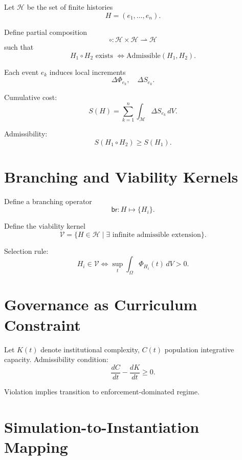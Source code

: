 \documentclass[12pt,oneside]{book}
\begin{document}
Let \(\mathcal{H}\) be the set of finite histories
\[
H = (e_1,\dots,e_n).
\]

Define partial composition
\[
\circ : \mathcal{H} \times \mathcal{H} \rightharpoonup \mathcal{H}
\]
such that
\[
H_1 \circ H_2 \text{ exists } \iff \text{Admissible}(H_1,H_2).
\]

Each event \(e_k\) induces local increments
\[
\Delta \Phi_{e_k}, \quad \Delta S_{e_k}.
\]

Cumulative cost:
\begin{equation}
S(H) = \sum_{k=1}^n \int_{\mathcal{M}} \Delta S_{e_k}\, dV.
\end{equation}

Admissibility:
\begin{equation}
S(H_1 \circ H_2) \ge S(H_1).
\end{equation}

\chapter{Branching and Viability Kernels}

Define a branching operator
\[
\mathsf{br} : H \mapsto \{H_i\}.
\]

Define the viability kernel
\begin{equation}
\mathcal{V} = \{ H \in \mathcal{H} \mid \exists \text{ infinite admissible extension} \}.
\end{equation}

Selection rule:
\begin{equation}
H_i \in \mathcal{V} \iff \sup_{t} \int_\Omega \Phi_{H_i}(t)\, dV > 0.
\end{equation}

\chapter{Governance as Curriculum Constraint}

Let \(K(t)\) denote institutional complexity, \(C(t)\) population integrative capacity.
Admissibility condition:
\begin{equation}
\frac{dC}{dt} - \frac{dK}{dt} \ge 0.
\end{equation}

Violation implies transition to enforcement-dominated regime.

\chapter{Simulation-to-Instantiation Mapping}
\end{document}
